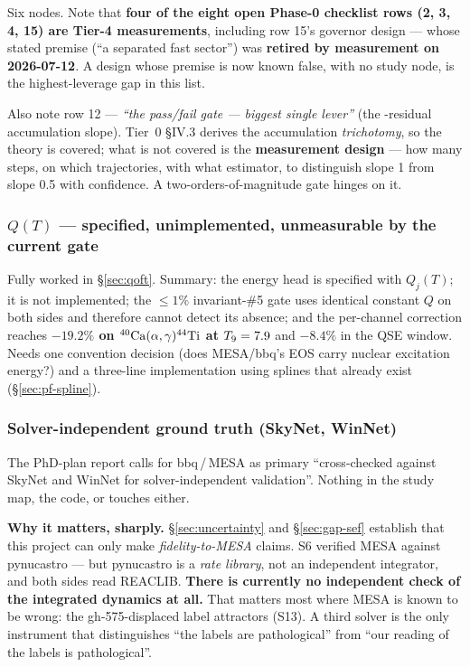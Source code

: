 Six nodes. Note that \textbf{four of the eight open Phase-0 checklist rows (2,
3, 4, 15) are Tier-4 measurements}, including row 15's governor design --- whose
stated premise (``a separated fast sector'') was \textbf{retired by measurement
on 2026-07-12}. A design whose premise is now known false, with no study node,
is the highest-leverage gap in this list.

Also note row 12 --- \emph{``the pass/fail gate --- biggest single lever''} (the
\Ye-residual accumulation slope). Tier~0 \S IV.3 derives the accumulation
\emph{trichotomy}, so the theory is covered; what is not covered is the
\textbf{measurement design} --- how many steps, on which trajectories, with what
estimator, to distinguish slope 1 from slope 0.5 with confidence. A
two-orders-of-magnitude gate hinges on it.

\subsubsection{\texorpdfstring{$Q(T)$}{Q(T)} --- specified, unimplemented, unmeasurable by the current gate}
\label{sec:gap-qoft}

Fully worked in \S\ref{sec:qoft}. Summary: the energy head is specified with
$Q_j(T)$; it is not implemented; the $\le1\%$ invariant-\#5 gate uses identical
constant $Q$ on both sides and therefore cannot detect its absence; and the
per-channel correction reaches \textbf{$-19.2\%$ on
$\nuc{Ca}{40}(\alpha,\gamma)\nuc{Ti}{44}$ at $\Tn = 7.9$} and $-8.4\%$ in the
QSE window. Needs one convention decision (does MESA/bbq's EOS carry nuclear
excitation energy?) and a three-line implementation using splines that already
exist (\S\ref{sec:pf-spline}).

\subsubsection{Solver-independent ground truth (SkyNet, WinNet)}
\label{sec:gap-thirdsolver}

The PhD-plan report calls for bbq\,/\,MESA as primary ``cross-checked against
SkyNet and WinNet for solver-independent validation''. Nothing in the study map,
the code, or  touches either.

\textbf{Why it matters, sharply.} \S\ref{sec:uncertainty} and
\S\ref{sec:gap-sef} establish that this project can only make
\emph{fidelity-to-MESA} claims. S6 verified MESA against pynucastro --- but
pynucastro is a \emph{rate library}, not an independent integrator, and both
sides read REACLIB. \textbf{There is currently no independent check of the
integrated dynamics at all.} That matters most where MESA is known to be wrong:
the gh-575-displaced label attractors (S13). A third solver is the only
instrument that distinguishes ``the labels are pathological'' from ``our reading
of the labels is pathological''.

